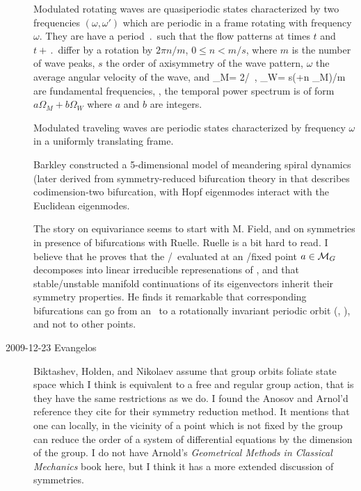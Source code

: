 \begin{description}
Modulated rotating waves are quasiperiodic states characterized
by two frequencies $(\omega,\omega')$ which are
periodic in a frame rotating with frequency $\omega$. They are
have
a period $\period{}$ such that the flow patterns
at times $t$ and $t+\period{}$ differ by a rotation by $2\pi n/m$,
$0 \leq n < m/s$,
where $m$ is the number of wave peaks, $s$ the order of
axisymmetry of the wave pattern, $\omega$ the average angular
velocity of the wave, and
\beq
\Omega_M= 2\pi /\period{}
	\,,\qquad
\Omega_W= s(\omega+n \Omega_M)/m
are fundamental frequencies, \ie, the temporal power spectrum
is of form $a\Omega_M+b \Omega_W$ where $a$ and $b$ are integers.

Modulated traveling waves are periodic states characterized
by frequency $\omega$ in a uniformly translating frame.

Barkley constructed a 5-dimensional model of meandering
spiral dynamics (later derived from symmetry-reduced
bifurcation theory in  that describes
codimension-two bifurcation, with Hopf eigenmodes interact with the
Euclidean eigenmodes.

The story on equivariance seems to start with M. Field,
and on symmetries in presence of bifurcations with
Ruelle. Ruelle is a bit hard to read. I believe that
he proves that the \stabmat/\jacobianM\ evaluated
at an \eqv/fixed point $a \in {\cal M}_G$ decomposes
into linear irreducible represenations of \Group,
and that stable/unstable manifold continuations of its
eigenvectors inherit their symmetry properties.
He finds it remarkable that corresponding bifurcations can
go from an \eqv\ to a rotationally invariant periodic
orbit (\ie, \reqv), and not to other points.

\item[2009-12-23 Evangelos]
Biktashev, Holden, and Nikolaev assume that group
orbits foliate state space which I think is equivalent to a
free and regular group action, that is they have the same
restrictions as we do.  I found the Anosov and Arnol'd reference
they cite for their symmetry reduction method. It mentions that
one can locally, in the vicinity of a point which is not fixed by
the group can reduce the order of a system of differential equations
by the dimension of the group. I do not have Arnold's \emph{Geometrical Methods
in Classical Mechanics} book here, but I think it has a more extended
discussion of symmetries.


\end{description}
